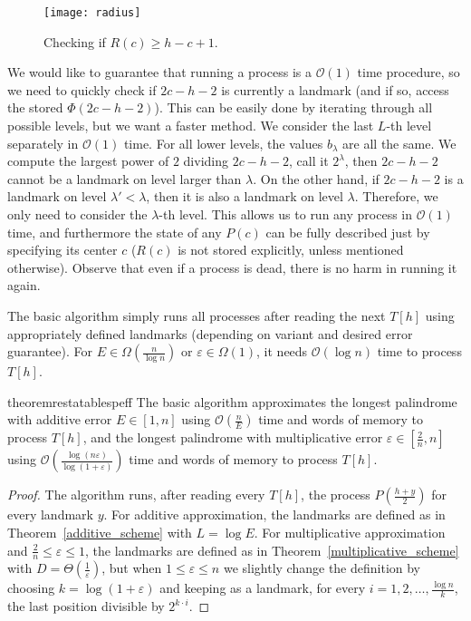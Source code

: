\documentclass{article}[11pt,letter]
\newcommand{\bigo}{\mathcal{O}}
\newcommand{\head}{h}
\newcommand{\hash}{\Phi}
\newcommand{\bhash}{\hash}
\newcommand{\aerr}{\ensuremath{E}}
\newcommand{\level}{\lambda}
\begin{document}
\begin{figure}[t]
\texttt{[image: radius]}
\caption{Checking if $R(c)\geq \head-c+1$.}
\label{fig:radius}
\end{figure}

We would like to guarantee that running a process is a $\bigo(1)$ time procedure, so we need to quickly check if $2c-\head-2$
is currently a landmark (and if so, access the stored $\bhash(2c-\head-2)$). This can be easily done by iterating through all possible levels, but we want a
faster method. We consider the last $L$-th level separately in $\bigo(1)$ time. For all lower levels, the values $b_{\level}$ are all the same. We compute
the largest power of $2$ dividing $2c-\head-2$, call it $2^{\level}$, then $2c-\head-2$ cannot be a landmark on level larger than $\level$.
On the other hand, if $2c-\head-2$ is a landmark on level $\level'<\level$, then it is also a landmark on level $\level$. Therefore, we only need to consider the
$\level$-th level. This allows us to run any process in $\bigo(1)$ time, and furthermore the state of any $P(c)$
can be fully described just by specifying its center $c$ ($R(c)$ is not stored explicitly, unless mentioned otherwise).
Observe that even if a process is dead, there is no harm in running it again.

The basic algorithm simply runs all processes after reading the next $T[\head]$ using appropriately defined landmarks (depending on variant
and desired error guarantee).
For $\aerr \in \Omega(\frac{n}{\log n})$ or $\varepsilon \in \Omega(1)$, it needs $\bigo(\log n)$ time to process $T[\head]$.


\begin{restatable}{theorem}{restatablespeff}
\label{th:sp_eff}
The basic algorithm approximates the longest palindrome with additive error $\aerr \in [1,n]$ using $\bigo(\frac{n}{\aerr})$ time and words of memory
to process $T[\head]$, and the longest palindrome with multiplicative error $\varepsilon \in [\frac2n,n]$ using $\bigo(\frac{\log(n\varepsilon)}{\log(1+\varepsilon)})$
time and words of memory to process $T[\head]$.
\end{restatable}

\begin{proof}
The algorithm runs, after reading every $T[\head]$, the process $P(\frac{\head+y}{2})$ for every landmark $y$.
For additive approximation, the landmarks are defined as in Theorem~\ref{additive_scheme} with $L=\log \aerr$.
For multiplicative approximation and $\frac2n \le \varepsilon \le 1$,
the landmarks are defined as in Theorem~\ref{multiplicative_scheme} with $D=\Theta(\frac{1}{\varepsilon})$,
but when $1 \le \varepsilon \le n$ we slightly change the definition by choosing $k = \log (1+\varepsilon)$ and keeping as a landmark,
for every $i=1,2,\ldots,\frac{\log n}{k}$, the last position divisible by $2^{k\cdot i}$.
\end{proof}
\end{document}
